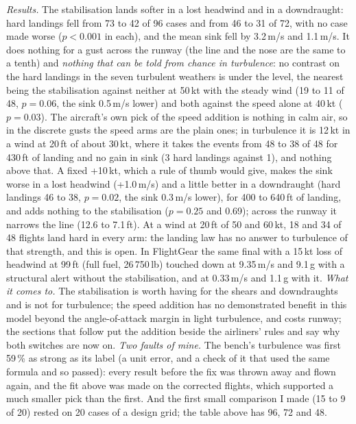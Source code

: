 \documentclass[10pt,a4paper,twocolumn]{article}
\begin{document}
\emph{Results.} The stabilisation lands softer in a lost headwind and in a downdraught: hard landings fell from 73 to 42 of 96 cases and from 46 to 31 of 72, with no case made worse ($p<0.001$ in each),
and the mean sink fell by 3.2\,m/s and 1.1\,m/s. It does nothing for a gust across the runway (the line and the nose are the same to a tenth) and \emph{nothing that can be told from chance in turbulence}: no
contrast on the hard landings in the seven turbulent weathers is under the level, the nearest being the stabilisation against neither at 50\,kt with the steady wind (19 to 11 of 48, $p=0.06$, the sink 0.5\,m/s lower)
and both against the speed alone at 40\,kt ($p=0.03$). The aircraft's own pick of the speed addition is nothing in calm air, so in the discrete gusts the speed arms are the plain ones; in turbulence it is 12\,kt in a wind at
20\,ft of about 30\,kt, where it takes the events from 48 to 38 of 48 for 430\,ft of landing and no gain in sink (3 hard landings against 1), and nothing above that. A fixed +10\,kt, which a rule of thumb would give, makes the
sink worse in a lost headwind (+1.0\,m/s) and a little better in a downdraught (hard landings 46 to 38, $p=0.02$, the sink 0.3\,m/s lower), for 400 to 640\,ft of landing, and adds nothing to the stabilisation ($p=0.25$ and 0.69);
across the runway it narrows the line (12.6 to 7.1\,ft). At a wind at 20\,ft of 50 and 60\,kt, 18 and 34 of 48 flights land hard in every arm: the landing law has no answer to turbulence of that strength, and this is open.
In FlightGear the same final with a 15\,kt loss of headwind at 99\,ft (full fuel, 26\,750\,lb) touched down at 9.35\,m/s and 9.1\,g with a structural alert without the stabilisation, and at 0.33\,m/s and 1.1\,g with it.
\emph{What it comes to.} The stabilisation is worth having for the shears and downdraughts and is not for turbulence; the speed addition has no demonstrated benefit in this model beyond the angle-of-attack margin in light turbulence,
and costs runway; the sections that follow put the addition beside the airliners' rules and say why both switches are now on. \emph{Two faults of mine.} The bench's turbulence was first 59\,\% as strong as its label (a unit error, and a check of it that used the same formula and so passed):
every result before the fix was thrown away and flown again, and the fit above was made on the corrected flights, which supported a much smaller pick than the first. And the first small comparison I made (15 to 9 of 20) rested on 20 cases of a
design grid; the table above has 96, 72 and 48.
\end{document}
